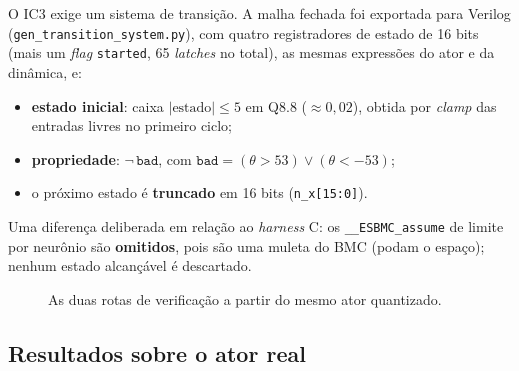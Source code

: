 \documentclass[12pt,openright,oneside,a4paper,chapter=TITLE,sumario=tradicional,english,brazil]{abntex2}
\begin{document}
O IC3 exige um sistema de transição. A malha fechada foi exportada para Verilog (\texttt{gen\_transition\_system.py}), com quatro registradores de estado de 16 bits (mais um \emph{flag} \texttt{started}, 65 \emph{latches} no total), as mesmas expressões do ator e da dinâmica, e:
\begin{itemize}
  \item \textbf{estado inicial}: caixa $|\text{estado}|\le5$ em Q8.8 ($\approx0{,}02$), obtida por \emph{clamp} das entradas livres no primeiro ciclo;
  \item \textbf{propriedade}: $\lnot\,\texttt{bad}$, com $\texttt{bad}=(\theta>53)\lor(\theta<-53)$;
  \item o próximo estado é \textbf{truncado} em 16 bits (\texttt{n\_x[15:0]}).
\end{itemize}
Uma diferença deliberada em relação ao \emph{harness} C: os \texttt{\_\_ESBMC\_assume} de limite por neurônio são \textbf{omitidos}, pois são uma muleta do BMC (podam o espaço); nenhum estado alcançável é descartado.

\begin{figure}[htb]
  \caption{As duas rotas de verificação a partir do mesmo ator quantizado.}\label{fig:rotas}
  \centering
\end{figure}

\subsection{Resultados sobre o ator real}
\end{document}
